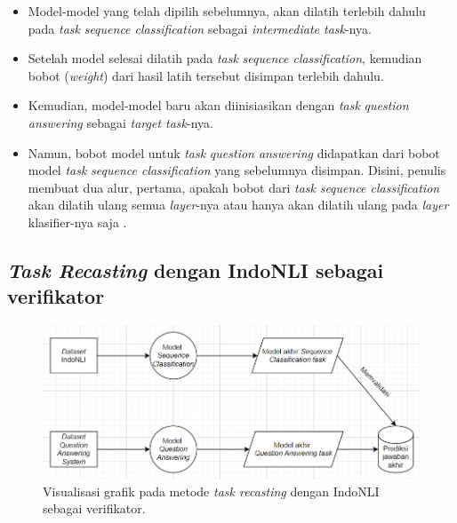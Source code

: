 \begin{itemize}
    
    \item Model-model yang telah dipilih sebelumnya, akan dilatih terlebih dahulu pada \emph{task} \emph{sequence classification} sebagai \emph{intermediate task}-nya.

    \item Setelah model selesai dilatih pada \emph{task} \emph{sequence classification}, kemudian bobot (\emph{weight}) dari hasil latih tersebut disimpan terlebih dahulu.

    \item Kemudian, model-model baru akan diinisiasikan dengan \emph{task} \emph{question answering} sebagai \emph{target task}-nya.

    \item Namun, bobot model untuk \emph{task} \emph{question answering} didapatkan dari bobot model \emph{task} \emph{sequence classification} yang sebelumnya disimpan. Disini, penulis membuat dua alur, pertama, apakah bobot dari  \emph{task} \emph{sequence classification} akan dilatih ulang semua \emph{layer}-nya atau hanya akan dilatih ulang pada \emph{layer} klasifier-nya saja \citep{lee2019elsa}.

\end{itemize}

\subsection{\emph{Task Recasting} dengan IndoNLI sebagai verifikator}

\begin{figure}[h]
\includegraphics[width=\linewidth]{assets/pics/alur2.png}
\centering
\caption{Visualisasi grafik pada metode \emph{task recasting} dengan IndoNLI sebagai verifikator.}
\end{figure}


